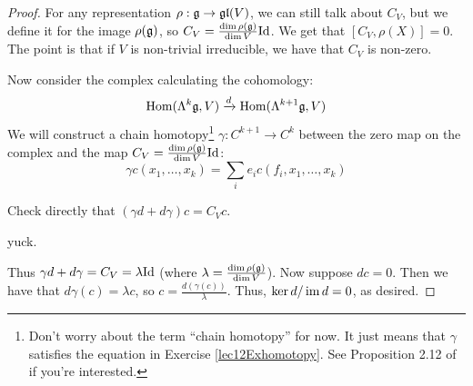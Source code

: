 \begin{proof}
   For any representation $\rho:\mathfrak{g} \to \mathfrak{gl}(V)$, we can still talk about $C_V$, but we
   define it for the image $\rho(\mathfrak{g})$, so $C_V = \frac{\dim \rho(\mathfrak{g})}{\dim V}\mathrm{Id}$. We get
   that $[C_V,\rho(X)]=0$. The point is that if $V$ is non-trivial irreducible, we
   have that $C_V$ is non-zero.

   Now consider the complex calculating the cohomology:
   \[
    \operatorname{Hom}(\Lambda^k \mathfrak{g}, V) \xrightarrow{d} \operatorname{Hom}(\Lambda^{k+1}\mathfrak{g}, V)
   \]
   We will construct a chain homotopy\footnote{Don't worry about the term ``chain
   homotopy'' for now. It just means that $\gamma$ satisfies the equation in Exercise
   \ref{lec12Exhomotopy}. See Proposition 2.12 of \cite{Hatcher} if you're
   interested.} $\gamma:C^{k+1}\to C^k$ between the zero map on the complex and the
   map $C_V = \frac{\dim \rho(\mathfrak{g})}{\dim V}\mathrm{Id}$:
   \[
    \gamma c(x_1,\dots,x_k) = \sum_i e_i c(f_i,x_1,\dots, x_k)
   \]
   \begin{exercise}\label{lec12Exhomotopy}
     Check directly that $(\gamma d+d\gamma)c = C_V c$.
     \begin{solution}
       yuck.
     \end{solution}
   \end{exercise}
   Thus $\gamma d +d\gamma = C_V = \lambda \mathrm{Id}$ (where $\lambda=\frac{\dim
   \rho(\mathfrak{g})}{\dim V}$).
   Now suppose $dc=0$.  Then we have that $d\gamma (c) =\lambda c$, so
   $c=\frac{d(\gamma(c))}{\lambda}$. Thus, $\ker d/\operatorname{im} d = 0$, as desired.
 \end{proof}

